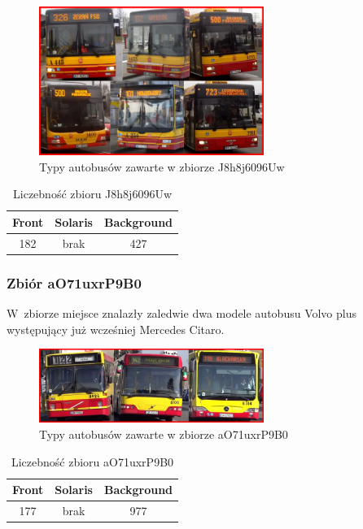 \begin{figure}[!h]
    \centering
    \includegraphics[width=0.65\textwidth]{img/exp_trainig_data_J8h}
    \caption{Typy autobusów zawarte w zbiorze J8h8j6096Uw}
    \label{fig:J8h8j6096Uw_types}
\end{figure}

\begin{table}[!h]
    \centering
    \begin{tabular}{c|c|c}
        Front   & Solaris   & Background \\ \hline
        182     & brak      & 427 
    \end{tabular}
    \caption{Liczebność zbioru J8h8j6096Uw}
    \label{tab:J8h8j6096Uw_count}
\end{table}

\subsubsection{Zbiór aO71uxrP9B0}

W~zbiorze miejsce znalazły zaledwie dwa modele autobusu Volvo plus 
występujący już wcześniej Mercedes Citaro.

\begin{figure}[!h]
    \centering
    \includegraphics[width=0.65\textwidth]{img/exp_trainig_data_aO7}
    \caption{Typy autobusów zawarte w zbiorze aO71uxrP9B0}
    \label{fig:aO71uxrP9B0_types}
\end{figure}

\begin{table}[!h]
    \centering
    \begin{tabular}{c|c|c}
        Front   & Solaris   & Background \\ \hline
        177     & brak      & 977 
    \end{tabular}
    \caption{Liczebność zbioru aO71uxrP9B0}
    \label{tab:aO71uxrP9B0_count}
\end{table}

